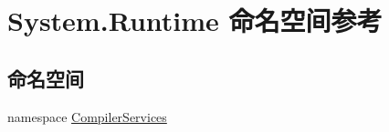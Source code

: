\hypertarget{namespace_system_1_1_runtime}{}\section{System.\+Runtime 命名空间参考}
\label{namespace_system_1_1_runtime}
\subsection*{命名空间}
\begin{DoxyCompactItemize}
\item 
namespace \hyperlink{namespace_system_1_1_runtime_1_1_compiler_services}{Compiler\+Services}
\end{DoxyCompactItemize}
